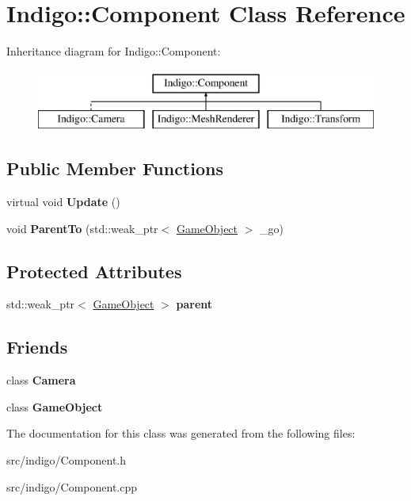 \hypertarget{class_indigo_1_1_component}{}\section{Indigo\+:\+:Component Class Reference}
\label{class_indigo_1_1_component}
Inheritance diagram for Indigo\+:\+:Component\+:\begin{figure}[H]
\begin{center}
\leavevmode
\includegraphics[height=2.000000cm]{class_indigo_1_1_component}
\end{center}
\end{figure}
\subsection*{Public Member Functions}
\begin{DoxyCompactItemize}
\item 
\mbox{\label{class_indigo_1_1_component_a4d55fda0bd189f6052934b689ad9c764}} 
virtual void {\bfseries Update} ()
\item 
\mbox{\label{class_indigo_1_1_component_a25c63cb94a289d25074d5b974cef0075}} 
void {\bfseries Parent\+To} (std\+::weak\+\_\+ptr$<$ \hyperlink{class_indigo_1_1_game_object}{Game\+Object} $>$ \+\_\+go)
\end{DoxyCompactItemize}
\subsection*{Protected Attributes}
\begin{DoxyCompactItemize}
\item 
\mbox{\label{class_indigo_1_1_component_a2b153d0ff77ec7c38a8881aa4d8cc110}} 
std\+::weak\+\_\+ptr$<$ \hyperlink{class_indigo_1_1_game_object}{Game\+Object} $>$ {\bfseries parent}
\end{DoxyCompactItemize}
\subsection*{Friends}
\begin{DoxyCompactItemize}
\item 
\mbox{\label{class_indigo_1_1_component_ad8bd9afbbd7af19d996da80e9d25890d}} 
class {\bfseries Camera}
\item 
\mbox{\label{class_indigo_1_1_component_a00df87c957d8f7ee0fc51f07a0542f4a}} 
class {\bfseries Game\+Object}
\end{DoxyCompactItemize}


The documentation for this class was generated from the following files\+:\begin{DoxyCompactItemize}
\item 
src/indigo/Component.\+h\item 
src/indigo/Component.\+cpp\end{DoxyCompactItemize}
